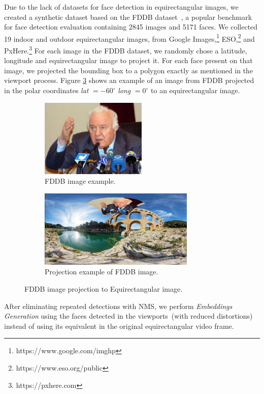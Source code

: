 Due to the lack of datasets for face detection in equirectangular images, we created a synthetic dataset based on the FDDB dataset~\cite{fddbTech}, a popular benchmark for face detection evaluation containing 2845 images and 5171 faces. We collected 19 indoor and outdoor equirectangular images, from Google Images,\footnote{https://www.google.com/imghp} ESO,\footnote{https://www.eso.org/public} and PxHere.\footnote{https://pxhere.com}
For each image in the FDDB dataset, we randomly chose a latitude, longitude and equirectangular image to project it. For each face present on that image, we projected the bounding box to a polygon exactly as mentioned in the viewport process. Figure \ref{fig:fddb_proj} shows an example of an image from FDDB projected in the polar coordinates \emph{lat} $ = -60^{\circ}$ \emph{long} $= 0^{\circ}$ to an equirectangular image.

\begin{figure}[!ht]
\centering
    \begin{subfigure}{0.4\linewidth}
        \centering
        \includegraphics[height=10em]{img/face_pre.png}
        \caption{FDDB image example.}
        \label{subfig:face_pre}
    \end{subfigure}\hfill
    \begin{subfigure}{0.55\linewidth}
        \centering
        \includegraphics[height=10em]{img/face_pos.png}
        \caption{Projection example of FDDB image.}
        \label{subfig:face_pos}
    \end{subfigure}

\caption{FDDB image projection to Equirectangular image.}
\label{fig:fddb_proj}
\end{figure}

After eliminating repeated detections with NMS, we perform \emph{Embeddings Generation} using the faces detected in the viewports~(with reduced distortions) instead of using its equivalent in the original equirectangular video frame.


